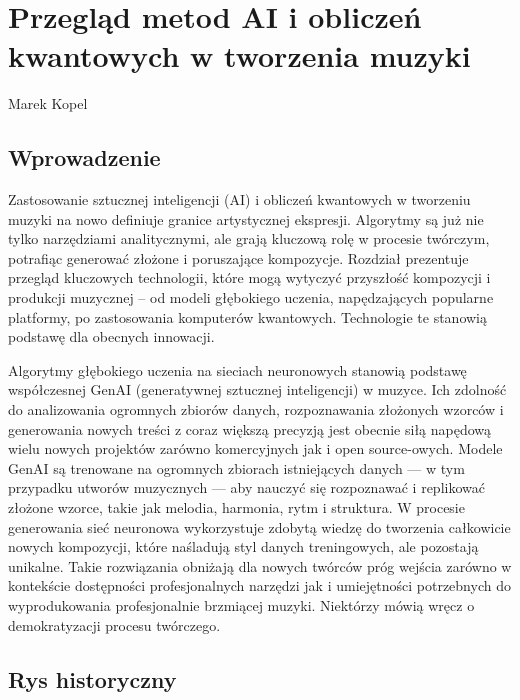 \chapter[Przegląd metod AI \ldots]{Przegląd metod AI i obliczeń kwantowych w tworzenia muzyki}
\thispagestyle{empty}
\vspace{-8mm} {\large Marek Kopel} \vspace{8mm}

\section{Wprowadzenie}

Zastosowanie sztucznej inteligencji (AI) i obliczeń kwantowych w tworzeniu muzyki na nowo definiuje granice artystycznej ekspresji. Algorytmy są już nie tylko narzędziami analitycznymi, ale grają kluczową rolę w procesie twórczym, potrafiąc generować złożone i poruszające kompozycje. Rozdział prezentuje przegląd kluczowych technologii, które mogą wytyczyć przyszłość kompozycji i produkcji muzycznej – od  modeli głębokiego uczenia, napędzających popularne platformy, po zastosowania komputerów kwantowych. Technologie te stanowią podstawę dla obecnych innowacji.

Algorytmy głębokiego uczenia na sieciach neuronowych stanowią podstawę współczesnej GenAI (generatywnej sztucznej inteligencji) w muzyce. Ich zdolność do analizowania ogromnych zbiorów danych, rozpoznawania złożonych wzorców i generowania nowych treści z coraz większą precyzją jest obecnie siłą napędową wielu nowych projektów zarówno komercyjnych jak i open source-owych. 
Modele GenAI są trenowane na ogromnych zbiorach istniejących danych — w tym przypadku utworów muzycznych — aby nauczyć się rozpoznawać i replikować złożone wzorce, takie jak melodia, harmonia, rytm i struktura. W procesie generowania sieć neuronowa wykorzystuje zdobytą wiedzę do tworzenia całkowicie nowych kompozycji, które naśladują styl danych treningowych, ale pozostają unikalne.
Takie rozwiązania obniżają dla nowych twórców próg wejścia zarówno w kontekście dostępności profesjonalnych narzędzi jak i umiejętności potrzebnych do wyprodukowania profesjonalnie brzmiącej muzyki. Niektórzy mówią wręcz o demokratyzacji procesu twórczego. 


\section{Rys historyczny}


